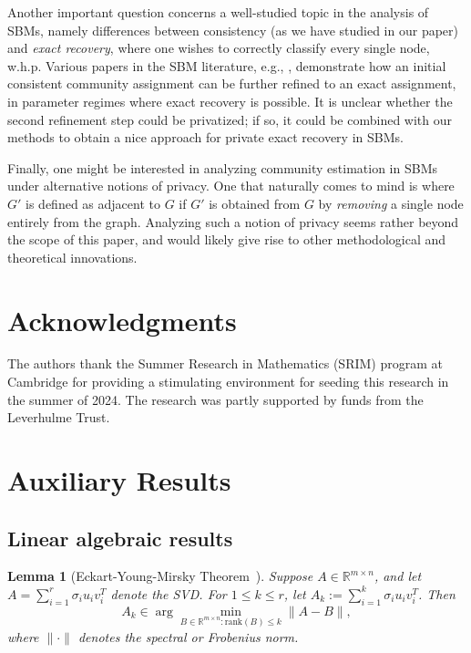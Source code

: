 \documentclass{article}
\newtheorem{lemma}{Lemma}
\newcommand{\real}{\mathbb{R}}
\begin{document}
Another important question concerns a well-studied topic in the analysis of SBMs, namely differences between consistency (as we have studied in our paper) and \emph{exact recovery}, where one wishes to correctly classify every single node, w.h.p. Various papers in the SBM literature, e.g., \cite{gao2017achieving}, demonstrate how an initial consistent community assignment can be further refined to an exact assignment, in parameter regimes where exact recovery is possible. It is unclear whether the second refinement step could be privatized; if so, it could be combined with our methods to obtain a nice approach for private exact recovery in SBMs.

Finally, one might be interested in analyzing community estimation in SBMs under alternative notions of privacy. One that naturally comes to mind is where $G'$ is defined as adjacent to $G$ if $G'$ is obtained from $G$ by \emph{removing} a single node entirely from the graph. Analyzing such a notion of privacy seems rather beyond the scope of this paper, and would likely give rise to other methodological and theoretical innovations.


\section*{Acknowledgments}

The authors thank the Summer Research in Mathematics (SRIM) program at Cambridge for providing a stimulating environment for seeding this research in the summer of 2024. The research was partly supported by funds from the Leverhulme Trust.


\appendix

\section{Auxiliary Results}
\label{Appendix_Aux_Res}

\subsection{Linear algebraic results}


\begin{lemma}[Eckart-Young-Mirsky Theorem~\cite{blum2020foundations}]
\label{LemEYM}
Suppose $A \in \real^{m \times n}$, and let $A = \sum_{i=1}^r \sigma_i u_i v_i^T$ denote the SVD. For $1 \le k \le r$, let $A_k := \sum_{i=1}^k \sigma_i u_i v_i^T$. Then
\begin{equation*}
A_k \in \arg\min_{B \in \real^{m \times n}: \text{rank}(B) \le k} \|A - B\|,
\end{equation*}
where $\|\cdot \|$ denotes the spectral or Frobenius norm.
\end{lemma}
\end{document}
